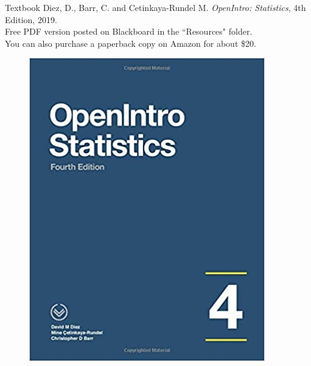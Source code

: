 \documentclass[10pt]{beamer}
\begin{document}
\begin{frame}{Textbook}
Diez, D., Barr, C. and Cetinkaya-Rundel M. \emph{OpenIntro: Statistics}, 4th Edition, 2019.\\
\vspace{5pt}
Free PDF version posted on Blackboard in the ``Resources" folder.\\
You can also purchase a paperback copy on Amazon for about \$20.\\

\begin{figure}
\includegraphics[scale=0.25]{figure/oi_cover.jpg}
\end{figure}
\end{frame}
\end{document}
